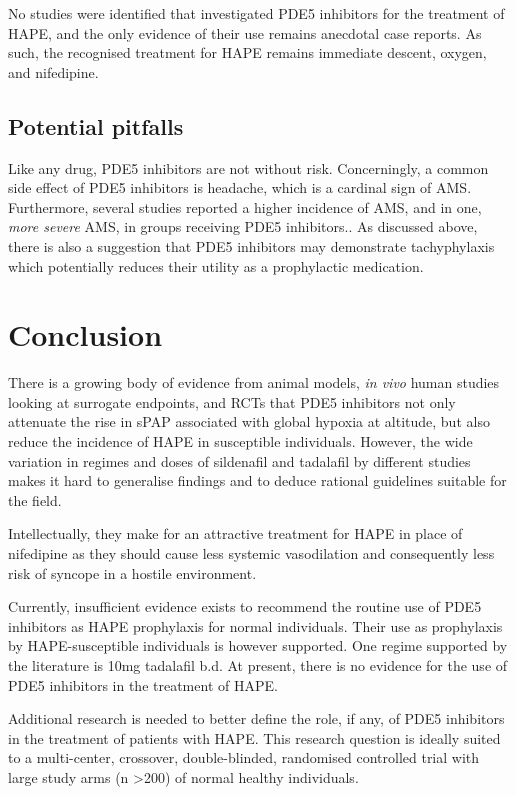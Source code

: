 \documentclass[12pt,a4paper]{article}
\begin{document}
No studies were identified that investigated PDE5 inhibitors for the treatment of HAPE, and the only evidence of their use remains anecdotal case reports. As such, the recognised treatment for HAPE remains immediate descent, oxygen, and nifedipine.

\subsection*{Potential pitfalls}

Like any drug, PDE5 inhibitors are not without risk. Concerningly, a common side effect of PDE5 inhibitors is headache, which is a cardinal sign of AMS. Furthermore, several studies reported a higher incidence of AMS, and in one, \emph{more severe} AMS, in groups receiving PDE5 inhibitors.\cite{Maggiorini:2006kz,Bates:2011du,Leshem:2012jq}. As discussed above, there is also a suggestion that PDE5 inhibitors may demonstrate tachyphylaxis which potentially reduces their utility as a prophylactic medication.\cite{Bates:2011du}

\section*{Conclusion}

There is a growing body of evidence from animal models, \emph{in vivo} human studies looking at surrogate endpoints, and RCTs that PDE5 inhibitors not only attenuate the rise in sPAP associated with global hypoxia at altitude, but also reduce the incidence of HAPE in susceptible individuals. However, the wide variation in regimes and doses of sildenafil and tadalafil by different studies makes it hard to generalise findings and to deduce rational guidelines suitable for the field.

Intellectually, they make for an attractive treatment for HAPE in place of nifedipine as they should cause less systemic vasodilation and consequently less risk of syncope in a hostile environment.\cite{JointFormularyCommittee:2013tz}

Currently, insufficient evidence exists to recommend the routine use of PDE5 inhibitors as HAPE prophylaxis for normal individuals. Their use as prophylaxis by HAPE-susceptible individuals is however supported. One regime supported by the literature is 10mg tadalafil b.d. At present, there is no evidence for the use of PDE5 inhibitors in the treatment of HAPE.

 Additional research is needed to better define the role, if any, of PDE5 inhibitors in the treatment of patients with HAPE. This research question is ideally suited to a multi-center, crossover, double-blinded, randomised controlled trial with large study arms (n >200) of normal healthy individuals.



\end{document}

